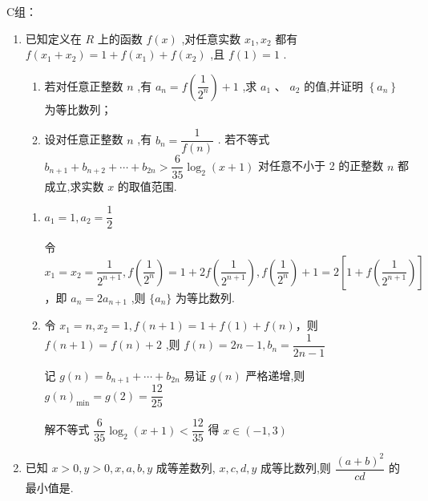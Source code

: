     C组：
    \begin{enumerate}
        \item 已知定义在 $R$ 上的函数 $f\left( x\right)$ ,对任意实数 ${x}_{1},{x}_{2}$ 都有$f\left( {{x}_{1} + {x}_{2}}\right)  = 1 + f\left( {x}_{1}\right)  + f\left( {x}_{2}\right)$ ,且 $f\left( 1\right)  = 1$ .
    \begin{enumerate}
        \item 若对任意正整数 $n$ ,有 ${a}_{n} = f\left( \dfrac{1}{{2}^{n}}\right)  + 1$ ,求 ${a}_{1}$ 、 ${a}_{2}$ 的值,并证明 $\left\{  {a}_{n}\right\}$ 为等比数列；
        \item 设对任意正整数 $n$ ,有 ${b}_{n} = \dfrac{1}{f\left( n\right) }$ . 若不等式${b}_{n + 1} + {b}_{n + 2} + \cdots  + {b}_{2n} > \dfrac{6}{35}{\log }_{2}\left( {x + 1}\right)$ 对任意不小于 2 的正整数 $n$ 都成立,求实数 $x$ 的取值范围.
    \end{enumerate}
    \begin{jieda}
        \begin{enumerate}
            \item ${a}_{1} = 1,{a}_{2} = \dfrac{1}{2}$
            
            令 ${x}_{1} = {x}_{2} = \dfrac{1}{{2}^{n + 1}},f\left( \dfrac{1}{{2}^{n}}\right)  = 1 + {2f}\left( \dfrac{1}{{2}^{n + 1}}\right) ,f\left( \dfrac{1}{{2}^{n}}\right)  + 1 = 2\left\lbrack  {1 + f\left( \dfrac{1}{{2}^{n + 1}}\right) }\right\rbrack$，即 ${a}_{n} = 2{a}_{n + 1}$ ,则 $\{a_n\}$ 为等比数列.

            \item 令 ${x}_{1} = n,{x}_{2} = 1,f\left( {n + 1}\right)  = 1 + f\left( 1\right)  + f\left( n\right)$，则 $f\left( {n + 1}\right)  = f\left( n\right)  + 2$ ,则 $f\left( n\right)  = {2n} - 1,{b}_{n} = \dfrac{1}{{2n} - 1}$

            记 $g\left( n\right)  = {b}_{n + 1} + \cdots  + {b}_{2n}$ 易证 $g\left( n\right)$ 严格递增,则 $g{\left( n\right) }_{\min } = g\left( 2\right)  = \dfrac{12}{25}$
            
            解不等式 $\dfrac{6}{35}{\log }_{2}\left( {x + 1}\right)  < \dfrac{12}{35}$ 得 $x \in  \left( {-1,3}\right)$
        \end{enumerate}
    \end{jieda}
    
    \item 已知 $x > 0,y > 0,x,a,b,y$ 成等差数列, $x,c,d,y$ 成等比数列,则 $\dfrac{{\left( a + b\right) }^{2}}{cd}$ 的最小值是.
    

\end{enumerate}
